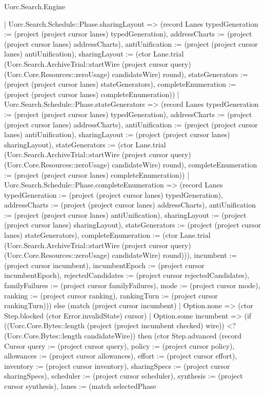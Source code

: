 \begin{lexlean}{Uorc.Search.Engine}
\begin{semanticmodule}
{{          | Uorc.Search.Schedule::Phase.sharingLayout => (record Lanes {typedGeneration := (project (project cursor lanes) typedGeneration), addressCharts := (project (project cursor lanes) addressCharts), antiUnification := (project (project cursor lanes) antiUnification), sharingLayout := (ctor Lane.trial (Uorc.Search.ArchiveTrial::startWire (project cursor query) (Uorc.Core.Resources::zeroUsage) candidateWire) round), stateGenerators := (project (project cursor lanes) stateGenerators), completeEnumeration := (project (project cursor lanes) completeEnumeration)})
          | Uorc.Search.Schedule::Phase.stateGenerators => (record Lanes {typedGeneration := (project (project cursor lanes) typedGeneration), addressCharts := (project (project cursor lanes) addressCharts), antiUnification := (project (project cursor lanes) antiUnification), sharingLayout := (project (project cursor lanes) sharingLayout), stateGenerators := (ctor Lane.trial (Uorc.Search.ArchiveTrial::startWire (project cursor query) (Uorc.Core.Resources::zeroUsage) candidateWire) round), completeEnumeration := (project (project cursor lanes) completeEnumeration)})
          | Uorc.Search.Schedule::Phase.completeEnumeration => (record Lanes {typedGeneration := (project (project cursor lanes) typedGeneration), addressCharts := (project (project cursor lanes) addressCharts), antiUnification := (project (project cursor lanes) antiUnification), sharingLayout := (project (project cursor lanes) sharingLayout), stateGenerators := (project (project cursor lanes) stateGenerators), completeEnumeration := (ctor Lane.trial (Uorc.Search.ArchiveTrial::startWire (project cursor query) (Uorc.Core.Resources::zeroUsage) candidateWire) round)})), incumbent := (project cursor incumbent), incumbentEpoch := (project cursor incumbentEpoch), rejectedCandidates := (project cursor rejectedCandidates), familyFailures := (project cursor familyFailures), mode := (project cursor mode), ranking := (project cursor ranking), rankingTurn := (project cursor rankingTurn)})) else (match (project cursor incumbent)
          | Option.none => (ctor Step.blocked (ctor Error.invalidState) cursor)
          | Option.some incumbent => (if ((Uorc.Core.Bytes::length (project (project incumbent checked) wire)) <? (Uorc.Core.Bytes::length candidateWire)) then (ctor Step.advanced (record Cursor {query := (project cursor query), policy := (project cursor policy), allowances := (project cursor allowances), effort := (project cursor effort), inventory := (project cursor inventory), sharingSpecs := (project cursor sharingSpecs), scheduler := (project cursor scheduler), synthesis := (project cursor synthesis), lanes := (match selectedPhase
}}
\end{semanticmodule}
\end{lexlean}
